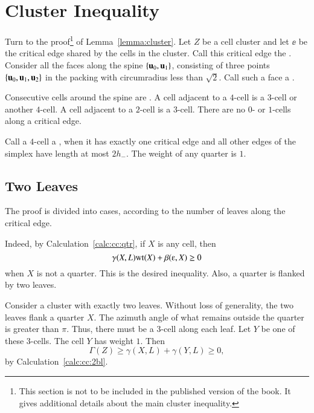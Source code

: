 \chapter{Cluster Inequality}

Turn to the proof\footnote{This section is not to be included
in the published version of the book.  It gives additional details about the
main cluster inequality.} of Lemma~\ref{lemma:cluster}.  Let $Z$ be a cell
cluster and let $\ee$ be the critical edge shared by the cells in the
cluster.  Call this critical edge the .  Consider all
the faces along the spine $\{ {\mathbf u}_0, {\mathbf u}_1\}$, consisting of three
points $\{ {\mathbf u}_0, {\mathbf u}_1, {\mathbf u}_2\}$ in the packing with circumradius less
than $\sqrt2$.  Call such a face a . 
%
%
%

Consecutive cells around the spine are .  A cell
adjacent to a $4$-cell is a $3$-cell or another $4$-cell.  A cell
adjacent to a $2$-cell is a $3$-cell.  There are no $0$- or $1$-cells
along a critical edge.  %
%

Call a $4$-cell a , when it has exactly one critical
edge and all other edges of the simplex have length at most $2 h_-$.
The weight of any quarter is $1$.


\section{Two Leaves}

The proof is  divided into cases, according to the number of
leaves along the critical edge.

 Indeed, by
Calculation~\ref{calc:cc:qtr}, if $X$ is any cell,
then %
\begin{displaymath} 
\gamma(X,L) \op{wt}(X) + \beta(\ee,X)\ge 0
\end{displaymath} 
when $X$ is not a quarter.  This is the desired inequality.  Also, a
quarter is flanked by two leaves.

Consider a cluster with exactly two leaves.
Without loss of generality, the two leaves flank a quarter
$X$. 
The azimuth angle of what remains outside the quarter
is greater than $\pi$.  Thus, there must be a $3$-cell
along each leaf.  Let $Y$ be one of these $3$-cells.
The cell $Y$ has weight $1$.
Then 
\begin{equation}\label{eqn:cc2bl} 
\Gamma(Z)\ge \gamma(X,L)+\gamma(Y,L)\ge 0,
\end{equation}
by Calculation~\ref{calc:cc:2bl}.
%
%

